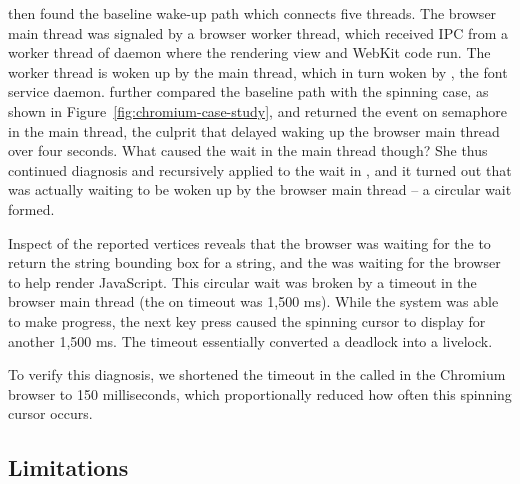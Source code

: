 \xxx then found the baseline wake-up path which connects five threads.
The browser main thread was signaled by a browser worker thread, which
received IPC from a worker thread of daemon  where the rendering view
and WebKit code run. The worker thread is woken up by the  main
thread, which in turn woken by , the font service daemon. \xxx further
compared the baseline path with the spinning case, as shown
in Figure~\ref{fig:chromium-case-study}, and returned the  event
on semaphore in the  main thread, the culprit that delayed
waking up the browser main thread over four seconds. What caused the wait in the
 main thread though? She thus continued diagnosis and recursively
applied \xxx to the wait in , and it turned out that  was
actually waiting to be woken up by the browser main thread -- a circular wait formed.



Inspect of the reported vertices reveals that the browser was waiting for
the  to return the string bounding box for a string, and the
 was waiting for the browser to help render JavaScript. This
circular wait was broken by a timeout in the browser main thread (the 
on  timeout was 1,500 ms). While the system was
able to make progress, the next key press caused the spinning cursor to display
for another 1,500 ms. The timeout essentially converted a deadlock into a
livelock.

To verify this diagnosis, we shortened the timeout in the
 called in the Chromium browser to 150
milliseconds, which proportionally reduced how often this spinning cursor
occurs.

\subsection{Limitations}

